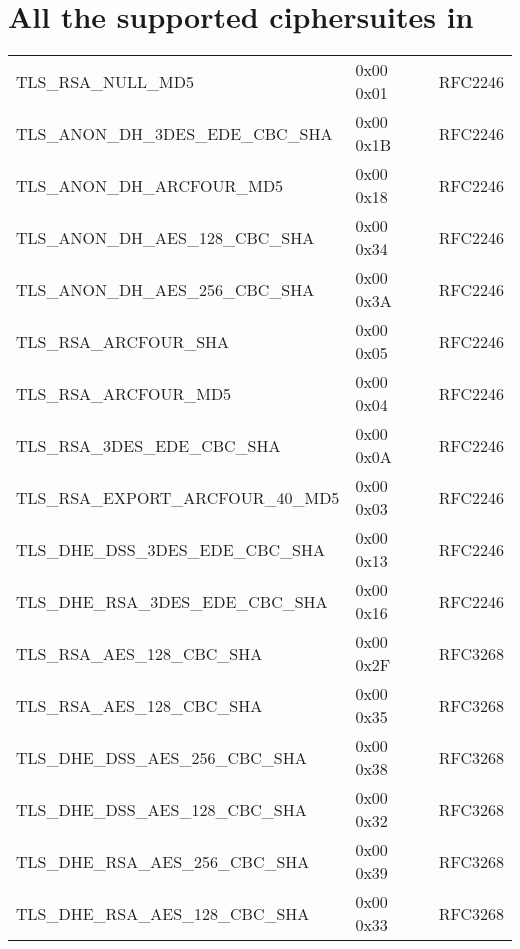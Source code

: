 \chapter{All the supported ciphersuites in \gnutls{}}\label{ap:ciphersuites}
\begin{center}
\tablelasttail{\hline}


\begin{supertabular}{|l|l|l|}
{\small{TLS\_RSA\_NULL\_MD5}} & 0x00 0x01 & RFC2246 \\
{\small{TLS\_ANON\_DH\_3DES\_EDE\_CBC\_SHA}} & 0x00 0x1B & RFC2246\\
{\small{TLS\_ANON\_DH\_ARCFOUR\_MD5}} & 0x00 0x18 & RFC2246 \\
{\small{TLS\_ANON\_DH\_AES\_128\_CBC\_SHA}} & 0x00 0x34 & RFC2246 \\
{\small{TLS\_ANON\_DH\_AES\_256\_CBC\_SHA}} & 0x00 0x3A & RFC2246 \\
{\small{TLS\_RSA\_ARCFOUR\_SHA}} & 0x00 0x05 & RFC2246 \\
{\small{TLS\_RSA\_ARCFOUR\_MD5}} & 0x00 0x04 & RFC2246 \\
{\small{TLS\_RSA\_3DES\_EDE\_CBC\_SHA}} & 0x00 0x0A & RFC2246 \\
{\small{TLS\_RSA\_EXPORT\_ARCFOUR\_40\_MD5}} & 0x00 0x03 & RFC2246 \\
{\small{TLS\_DHE\_DSS\_3DES\_EDE\_CBC\_SHA}} & 0x00 0x13 & RFC2246 \\
{\small{TLS\_DHE\_RSA\_3DES\_EDE\_CBC\_SHA}} & 0x00 0x16 & RFC2246 \\

{\small{TLS\_RSA\_AES\_128\_CBC\_SHA}} & 0x00 0x2F & RFC3268 \\
{\small{TLS\_RSA\_AES\_128\_CBC\_SHA}} & 0x00 0x35 & RFC3268 \\
{\small{TLS\_DHE\_DSS\_AES\_256\_CBC\_SHA}} & 0x00 0x38 & RFC3268 \\
{\small{TLS\_DHE\_DSS\_AES\_128\_CBC\_SHA}} & 0x00 0x32 & RFC3268 \\
{\small{TLS\_DHE\_RSA\_AES\_256\_CBC\_SHA}} & 0x00 0x39 & RFC3268 \\
{\small{TLS\_DHE\_RSA\_AES\_128\_CBC\_SHA}} & 0x00 0x33 & RFC3268 \\


\end{supertabular}
\end{center}
